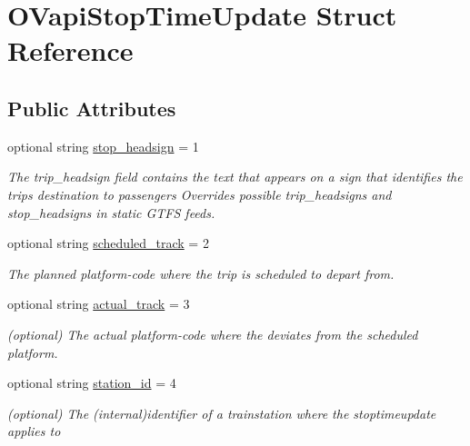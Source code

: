 \hypertarget{structOVapiStopTimeUpdate}{}\section{O\+Vapi\+Stop\+Time\+Update Struct Reference}
\label{structOVapiStopTimeUpdate}
\subsection*{Public Attributes}
\begin{DoxyCompactItemize}
\item 
optional string \hyperlink{structOVapiStopTimeUpdate_af56f2bfaef6f7f4718ab363d931c91a1}{stop\+\_\+headsign} = 1
\begin{DoxyCompactList}\small\item\em The trip\+\_\+headsign field contains the text that appears on a sign that identifies the trip\textquotesingle{}s destination to passengers Overrides possible trip\+\_\+headsign\textquotesingle{}s and stop\+\_\+headsign\textquotesingle{}s in static G\+T\+FS feeds. \end{DoxyCompactList}\item 
optional string \hyperlink{structOVapiStopTimeUpdate_ad0c47f6abfd9feac16d9b6113d4cb760}{scheduled\+\_\+track} = 2\hypertarget{structOVapiStopTimeUpdate_ad0c47f6abfd9feac16d9b6113d4cb760}{}\label{structOVapiStopTimeUpdate_ad0c47f6abfd9feac16d9b6113d4cb760}

\begin{DoxyCompactList}\small\item\em The planned platform-\/code where the trip is scheduled to depart from. \end{DoxyCompactList}\item 
optional string \hyperlink{structOVapiStopTimeUpdate_a08ea76ae903da828a1e72ea34e7acff0}{actual\+\_\+track} = 3\hypertarget{structOVapiStopTimeUpdate_a08ea76ae903da828a1e72ea34e7acff0}{}\label{structOVapiStopTimeUpdate_a08ea76ae903da828a1e72ea34e7acff0}

\begin{DoxyCompactList}\small\item\em (optional) The actual platform-\/code where the deviates from the scheduled platform. \end{DoxyCompactList}\item 
optional string \hyperlink{structOVapiStopTimeUpdate_a1b321e52c439cb12cc3898e6012e53b0}{station\+\_\+id} = 4\hypertarget{structOVapiStopTimeUpdate_a1b321e52c439cb12cc3898e6012e53b0}{}\label{structOVapiStopTimeUpdate_a1b321e52c439cb12cc3898e6012e53b0}

\begin{DoxyCompactList}\small\item\em (optional) The (internal)identifier of a trainstation where the stoptimeupdate applies to \end{DoxyCompactList}\end{DoxyCompactItemize}


